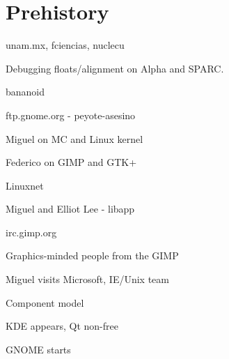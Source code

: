\chapter{Prehistory}

unam.mx, fciencias, nuclecu

Debugging floats/alignment on Alpha and SPARC.

bananoid

ftp.gnome.org - peyote-asesino

Miguel on MC and Linux kernel

Federico on GIMP and GTK+

Linuxnet

Miguel and Elliot Lee - libapp

irc.gimp.org

Graphics-minded people from the GIMP

Miguel visits Microsoft, IE/Unix team

Component model

KDE appears, Qt non-free

GNOME starts

